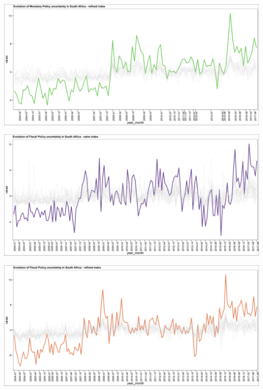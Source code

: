 \documentclass[11pt,preprint, authoryear]{elsarticle}
\let\origfigure\figure
\let\endorigfigure\endfigure
\renewenvironment{figure}[1][2] {
    \expandafter\origfigure\expandafter[H]
} {
    \endorigfigure
}
\numberwithin{equation}{section}
\numberwithin{figure}{section}
\numberwithin{table}{section}
\begin{document}
\begin{figure}
	\centering
	\includegraphics[width=\linewidth, keepaspectratio]{bin/monetary_comp_refine}\\
	\caption{Composite Monetary Policy uncertainty refined index. \label{fig_mon_comp_r}}
\end{figure}

\begin{figure}
	\centering
	\includegraphics[width=\linewidth, keepaspectratio]{bin/fiscal_comp_naive}\\
	\caption{Composite Fiscal Policy uncertainty naive index. \label{fig_fis_comp_n}}
\end{figure}

\begin{figure}
	\centering
	\includegraphics[width=\linewidth, keepaspectratio]{bin/fiscal_comp_refine}\\	
	\caption{Composite Fiscal Policy uncertainty refined index. \label{fig_fis_comp_r}}
\end{figure}
\end{document}
